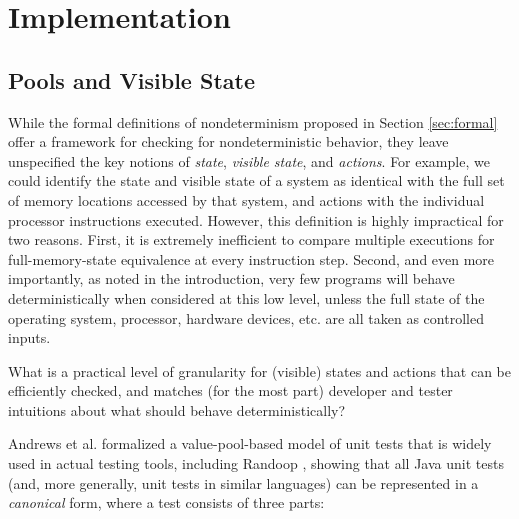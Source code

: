 \section{Implementation}

\begin{comment}
The implementation of the above ideas is conceptually straightforward,
and should be easy to apply in other automated test generation
settings with a natural notion of actions.  We present our
implementation by first sketching a mapping from the formalism to one
particular popular way to represent automatically generated unit
tests, in Section \ref{sec:pools}.  The particular implementations of
horizontal (Section \ref{sec:horizimp}) and vertical (Section
\ref{sec:vertimp}) determinism checks, as well as probabilistic
delta-debugging support (Section \ref{sec:ddimp}) are described after a general
overview of the TSTL testing tool (Section \ref{sec:tstlintro}).
\end{comment}

\subsection{Pools and Visible State}
\label{sec:pools}

While the formal definitions of nondeterminism proposed in Section
\ref{sec:formal} offer a framework for checking for nondeterministic
behavior, they leave unspecified the key notions of \emph{state},
\emph{visible state}, and \emph{actions}.  For example, we could
identify the state and visible state of a system as identical with the
full set of memory locations accessed by that system, and actions with the
individual processor instructions executed.  However, this
definition is highly impractical for two reasons.  First, it is
extremely inefficient to compare multiple executions for
full-memory-state equivalence at every instruction step.  Second, and
even more importantly, as noted in the introduction, very few programs
will behave deterministically when considered at this low level,
unless the full state of the operating system, processor, hardware
devices, etc. are all taken as controlled inputs.

What is a practical level of granularity for (visible) states and actions that
can be efficiently checked, and matches (for the most part) developer
and tester intuitions about what should behave deterministically?

Andrews et al. formalized a value-pool-based model of unit tests that is widely used in
actual testing tools, including Randoop \cite{Pacheco}, showing that
all Java unit tests (and, more generally, unit tests in similar
languages) can be represented in a \emph{canonical} form, where
a test consists of three parts:

